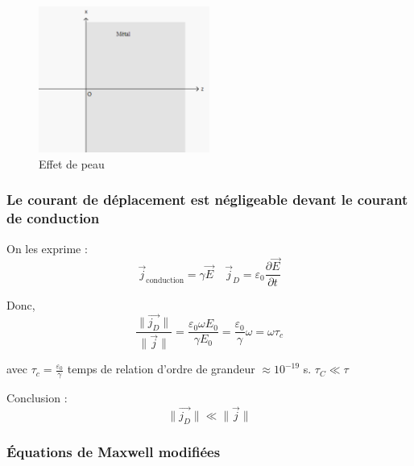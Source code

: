 \begin{figure}[H] %
  \centering
  \includegraphics[width=0.5\textwidth]{./assets/Effet de peau.png}
  \caption{Effet de peau}
  \label{fig:Effet de peau}
\end{figure}




\subsubsection{Le courant de déplacement est négligeable devant le courant de conduction} %
\label{sec:Le courant de déplacement est négligeable devant le courant de conduction}

On les exprime : 
\begin{equation}
  \overrightarrow{j} _{\text{conduction}} = \gamma \overrightarrow{E}  \quad  \overrightarrow{j} _D = \varepsilon_0 \frac{\partial \overrightarrow{E}}{\partial t} 
\end{equation}

Donc, 
\begin{equation}
  \frac{ \| \overrightarrow{j_D} \|}{ \| \overrightarrow{j} \|} = \frac{\varepsilon_0 \omega E_0}{\gamma E_0}  = \frac{\varepsilon_0}{\gamma}  \omega = \omega \tau_c
\end{equation}

avec $\tau_c = \frac{\varepsilon_0}{\gamma} $ temps de relation d'ordre de grandeur $\approx 10 ^{-19}$ s. $\tau_C \ll \tau$

Conclusion : 
\begin{equation}
  \| \overrightarrow{j_D} \| \ll \| \overrightarrow{j} \|
\end{equation}

\subsubsection{Équations de Maxwell modifiées} %
\label{sec:Équations de Maxwell modifiées}

